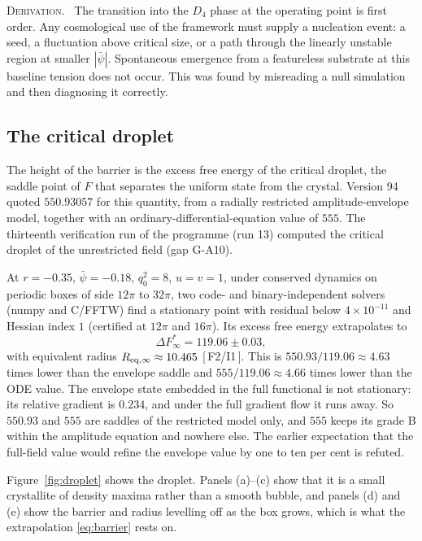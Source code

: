 \documentclass[a4paper,11pt]{article}
\makeatletter
\numberwithin{equation}{section}
\theoremstyle{jsplain}
\theoremstyle{jsrem}
\newcommand{\lbl}[1]{\textcolor{lbl@#1}{\textsc{#1}}.\ }
\newcommand{\grade}[1]{[\,#1\,]}
\makeatother
\begin{document}
\lbl{Derivation} The transition into the $D_4$ phase at the operating point is first order. Any cosmological use of the framework must supply a nucleation event: a seed, a fluctuation above critical size, or a path through the linearly unstable region at smaller $|\bar\psi|$. Spontaneous emergence from a featureless substrate at this baseline tension does not occur. This was found by misreading a null simulation and then diagnosing it correctly.

\subsection{The critical droplet}

The height of the barrier is the excess free energy of the critical droplet, the saddle point of $F$ that separates the uniform state from the crystal. Version 94 quoted $550.93057$ for this quantity, from a radially restricted amplitude-envelope model, together with an ordinary-differential-equation value of $555$. The thirteenth verification run of the programme (run 13) computed the critical droplet of the unrestricted field (gap G-A10).

At $r=-0.35$, $\bar\psi=-0.18$, $q_0^2=8$, $u=v=1$, under conserved dynamics on periodic boxes of side $12\pi$ to $32\pi$, two code- and binary-independent solvers (numpy and C/FFTW) find a stationary point with residual below $4\times10^{-11}$ and Hessian index $1$ (certified at $12\pi$ and $16\pi$). Its excess free energy extrapolates to
\begin{equation}\label{eq:barrier}
\Delta F^*_\infty=119.06\pm0.03,
\end{equation}
with equivalent radius $R_{\rm eq,\infty}\approx10.465$ \grade{F2/I1}. This is $550.93/119.06\approx4.63$ times lower than the envelope saddle and $555/119.06\approx4.66$ times lower than the ODE value. The envelope state embedded in the full functional is not stationary: its relative gradient is $0.234$, and under the full gradient flow it runs away. So $550.93$ and $555$ are saddles of the restricted model only, and $555$ keeps its grade B within the amplitude equation and nowhere else. The earlier expectation that the full-field value would refine the envelope value by one to ten per cent is refuted.

Figure~\ref{fig:droplet} shows the droplet. Panels (a)--(c) show that it is a small crystallite of density maxima rather than a smooth bubble, and panels (d) and (e) show the barrier and radius levelling off as the box grows, which is what the extrapolation \eqref{eq:barrier} rests on.
\end{document}
